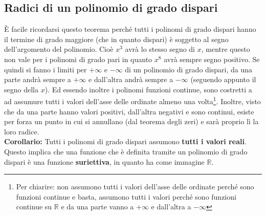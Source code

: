 \subsection{Radici di un polinomio di grado dispari}


È facile ricordarsi questo teorema perché tutti i polinomi di grado dispari hanno il termine di grado maggiore (che in quanto dispari) è soggetto al segno dell'argomento del polinomio. Cioè $x^3$ avrà lo stesso segno di $x$, mentre questo non vale per i polinomi di grado pari in quanto $x^8$ avrà sempre segno positivo. Se quindi si fanno i limiti per $+\infty$ e $-\infty$ di un polinomio di grado dispari, da una parte andrà sempre a $+\infty$ e dall'altra andrà sempre a $-\infty$ (seguendo appunto il segno della $x$). Ed essendo inoltre i polinomi funzioni continue, sono costretti a ad assumure tutti i valori dell'asse delle ordinate almeno una volta\footnote{Per chiarire: non assumono tutti i valori dell'asse delle ordinate perché sono funzioni continue e basta, assumono tutti i valori perché sono funzioni continue su $\mathbb{R}$ e da una parte vanno a $+\infty$ e dall'altra a $-\infty$}. Inoltre, visto che da una parte hanno valori positivi, dall'altra negativi e sono continui, esiste per forza un punto in cui si annullano (dal teorema degli zeri) e sarà proprio lì la loro radice.\\

\textbf{Corollario:}
Tutti i polinomi di grado dispari assumono \textbf{tutti i valori reali}. Questo implica che una funzione che è definita tramite un polinomio di grado dispari è una funzione \textbf{suriettiva}, in quanto ha come immagine $\mathbb{R}$.

